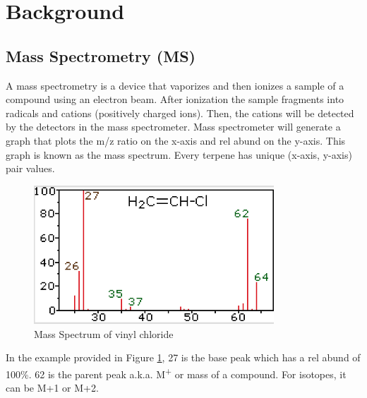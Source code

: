 \documentclass[12pt, a4paper]{article}
\begin{document}
\section{Background}

\subsection{Mass Spectrometry (MS)}
A mass spectrometry is a device that vaporizes and then ionizes a sample of a compound using an electron beam. After ionization the sample fragments into radicals and cations (positively charged ions). Then, the cations will be detected by the detectors in the mass spectrometer. Mass spectrometer will generate a graph that plots the %
m/z ratio on the x-axis and \gls{rel abund} on the y-axis. This graph is known as the mass spectrum. Every terpene has unique (x-axis, y-axis) pair values.

\begin{figure}[!ht]
\centering
    \begin{center}
        \includegraphics[width=9cm]{vyn.png}
    \end{center}
    \caption{Mass Spectrum of vinyl chloride}
    \label{fig:vyn}
\end{figure}


In the example provided in Figure \ref{fig:vyn}, 27 is the base peak which has a \gls{rel abund} of 100\%. 62 is the parent peak a.k.a. M\textsuperscript{+} or mass of a compound. For isotopes, it can be M+1 or M+2.
\end{document}
